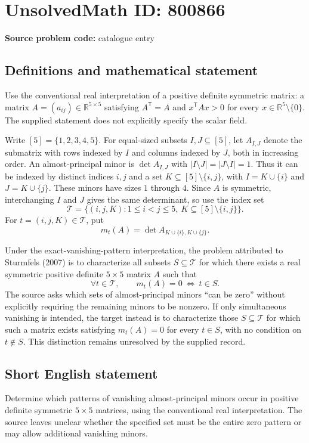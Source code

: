 \documentclass[11pt]{article}
\newcommand{\R}{\mathbb{R}}
\begin{document}
\section*{UnsolvedMath ID: 800866}
\textbf{Source problem code:} catalogue entry
\subsection{Definitions and mathematical statement}
Use the conventional real interpretation of a positive definite symmetric matrix: a matrix \(A=(a_{ij})\in\R^{5\times5}\) satisfying \(A^{\mathsf T}=A\) and \(x^{\mathsf T}Ax>0\) for every \(x\in\R^5\setminus\{0\}\). The supplied statement does not explicitly specify the scalar field.

Write \([5]=\{1,2,3,4,5\}\). For equal-sized subsets \(I,J\subseteq[5]\), let \(A_{I,J}\) denote the submatrix with rows indexed by \(I\) and columns indexed by \(J\), both in increasing order. An almost-principal minor is \(\det A_{I,J}\) with \(|I\setminus J|=|J\setminus I|=1\). Thus it can be indexed by distinct indices \(i,j\) and a set \(K\subseteq[5]\setminus\{i,j\}\), with \(I=K\cup\{i\}\) and \(J=K\cup\{j\}\). These minors have sizes \(1\) through \(4\). Since \(A\) is symmetric, interchanging \(I\) and \(J\) gives the same determinant, so use the index set
\[
\mathcal T=\{(i,j,K):1\le i<j\le5,\ K\subseteq[5]\setminus\{i,j\}\}.
\]
For \(t=(i,j,K)\in\mathcal T\), put
\[
m_t(A)=\det A_{K\cup\{i\},K\cup\{j\}}.
\]

Under the exact-vanishing-pattern interpretation, the problem attributed to Sturmfels (2007) is to characterize all subsets \(S\subseteq\mathcal T\) for which there exists a real symmetric positive definite \(5\times5\) matrix \(A\) such that
\[
\forall t\in\mathcal T,\qquad m_t(A)=0\ \Longleftrightarrow\ t\in S.
\]
The source asks which sets of almost-principal minors ``can be zero'' without explicitly requiring the remaining minors to be nonzero. If only simultaneous vanishing is intended, the target instead is to characterize those \(S\subseteq\mathcal T\) for which such a matrix exists satisfying \(m_t(A)=0\) for every \(t\in S\), with no condition on \(t\notin S\). This distinction remains unresolved by the supplied record.
\subsection{Short English statement}
Determine which patterns of vanishing almost-principal minors occur in positive definite symmetric \(5\times5\) matrices, using the conventional real interpretation. The source leaves unclear whether the specified set must be the entire zero pattern or may allow additional vanishing minors.
\end{document}
